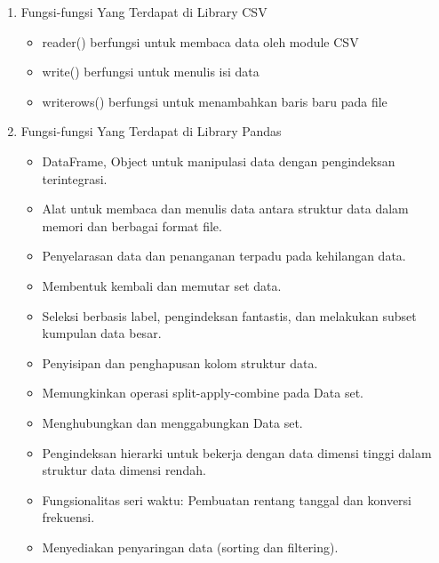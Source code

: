 \begin{enumerate}
\item Fungsi-fungsi Yang Terdapat di Library CSV
\begin{itemize}
\item reader() berfungsi untuk membaca data oleh module CSV
\item write() berfungsi untuk menulis isi data
\item writerows() berfungsi untuk menambahkan baris baru pada file
\end{itemize}

\item Fungsi-fungsi Yang Terdapat di Library Pandas
\begin{itemize}
\item DataFrame, Object untuk manipulasi data dengan pengindeksan terintegrasi.
\item Alat untuk membaca dan menulis data antara struktur data dalam memori dan berbagai format file.
\item Penyelarasan data dan penanganan terpadu pada kehilangan data.
\item Membentuk kembali dan memutar set data.
\item Seleksi berbasis label, pengindeksan fantastis, dan melakukan subset kumpulan data besar.
\item Penyisipan dan penghapusan kolom struktur data.
\item Memungkinkan operasi split-apply-combine pada Data set.
\item Menghubungkan dan menggabungkan Data set.
\item Pengindeksan hierarki untuk bekerja dengan data dimensi tinggi dalam struktur data dimensi rendah.
\item Fungsionalitas seri waktu: Pembuatan rentang tanggal dan konversi frekuensi.
\item Menyediakan penyaringan data (sorting dan filtering).
\end{itemize}
\end{enumerate}


